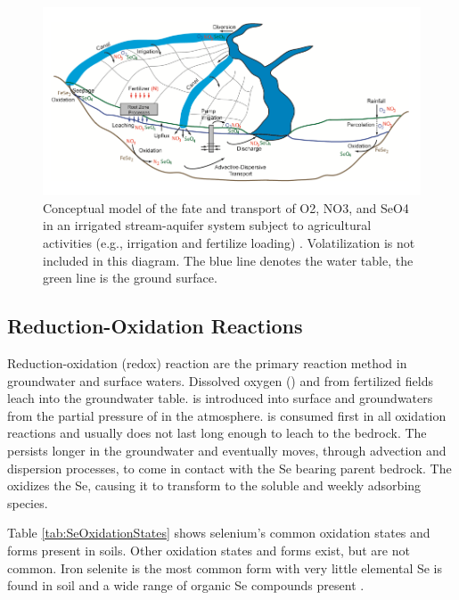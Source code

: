 \begin{linenumbers}[1]
\begin{figure}[htbp]
	\centering
	\includegraphics[scale=1]{"Figures/fateAndTransport"}
	\caption[Conceptual model of the fate and transport of O2, NO3, and SeO4 in an irrigated stream-aquifer system subject to agricultural activities.]{Conceptual model of the fate and transport of O2, NO3, and SeO4 in an irrigated stream-aquifer system subject to agricultural activities (e.g., irrigation and fertilize loading) \citep{Bailey2012}.  Volatilization is not included in this diagram.  The blue line denotes the water table, the green line is the ground surface.}
	\label{fig:fateAndTransport}
\end{figure}

\subsection*{Reduction-Oxidation Reactions}
Reduction-oxidation (redox) reaction are the primary reaction method in groundwater and surface waters.  Dissolved oxygen (\dox) and \nitrate from fertilized fields leach into the groundwater table.   \dox is introduced into surface and groundwaters from the partial pressure of \dox in the atmosphere.  \dox is consumed first in all oxidation reactions and usually does not last long enough to leach to the bedrock.  The \nitrate persists longer in the groundwater and eventually moves, through advection and dispersion processes, to come in contact with the Se bearing parent bedrock.  The \nitrate oxidizes the Se, causing it to transform to the soluble and weekly adsorbing \selenate species.

Table \ref{tab:SeOxidationStates} shows selenium's common oxidation states and forms present in soils.  Other oxidation states and forms exist, but are not common.  Iron selenite is the most common form with very little elemental Se is found in soil and a wide range of organic Se compounds present \citep{Painter1940}.


\end{linenumbers}

